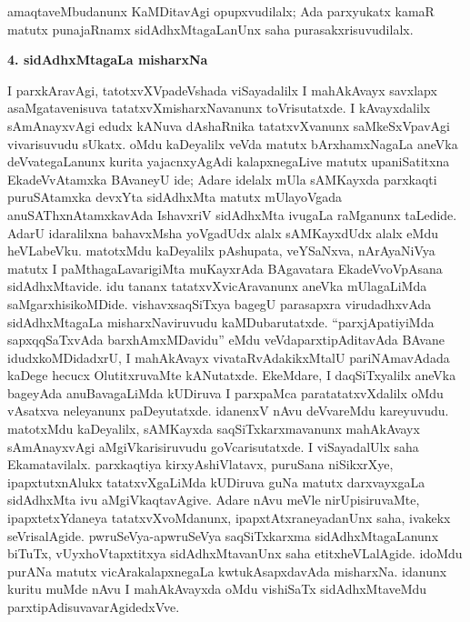 amaqtaveMbudanunx KaMDitavAgi opupxvudilalx; Ada parxyukatx kamaR matutx punajaRnamx sidAdhxMtagaLanUnx saha purasakxrisuvudilalx.

\newpage

\begin{center}
{\Large\bf 4. sidAdhxMtagaLa misharxNa}
\end{center}

I parxkAravAgi, tatotxvXVpadeVshada viSayadalilx I mahAkAvayx savxlapx asaMgata\-venisuva tatatxvXmisharxNavanunx toVrisutatxde. I kAvayxdalilx sAmAnayxvAgi edudx kANuva dAshaRnika tatatxvXvanunx saMkeSxVpavAgi vivarisuvudu sUkatx. oMdu kaDeyalilx veVda matutx bArxhamxNagaLa aneVka deVvategaLanunx kurita yajacnxyAgAdi kalapxnegaLive matutx upaniSatitxna EkadeVvAtamxka BAvaneyU ide; Adare idelalx mUla sAMKayxda parxkaqti puruSAtamxka devxYta sidAdhxMta matutx mUlayoVgada anuSAThxnAtamxkavAda IshavxriV sidAdhxMta ivugaLa raMganunx taLedide. AdarU idaralilxna bahavxMsha yoVgadUdx alalx sAMKayxdUdx alalx eMdu heVLabeVku. matotxMdu kaDeyalilx pAshupata, veYSaNxva, nArAyaNiVya matutx I paMthagaLavarigiMta muKayxrAda BAgavatara EkadeVvoVpAsana sidAdhxMtavide. idu tananx tatatxvXvicAravanunx aneVka mUlagaLiMda saMgarxhisikoMDide. vishavxsaqSiTxya bagegU parasapxra virudadhxvAda sidAdhxMtagaLa misharxNaviruvudu kaMDubarutatxde. ``parxjApatiyiMda sapxqqSaTxvAda barxhAmxMDavidu'' eMdu veVdaparxtipAditavAda BAvane idudxkoMDidadxrU, I mahAkAvayx vivataRvAdakikxMtalU pariNAmavAdada kaDege hecucx OlutitxruvaMte kANutatxde. EkeMdare, I daqSiTxyalilx aneVka bageyAda anuBavagaLiMda kUDiruva I parxpaMca paratatatxvXdalilx oMdu vAsatxva neleyanunx paDeyutatxde. idanenxV nAvu deVvareMdu kareyuvudu. matotxMdu kaDeyalilx, sAMKayxda saqSiTxkarxmavanunx mahAkAvayx sAmAnayxvAgi aMgiVkarisiruvudu goVcarisutatxde. I viSayadalUlx saha Ekamatavilalx. parxkaqtiya kirxyAshiVlatavx, puruSana niSikxrXye, ipapxtutxnAlukx tatatxvXgaLiMda kUDiruva guNa matutx darxvayxgaLa sidAdhxMta ivu aMgiVkaqtavAgive. Adare nAvu meVle nirUpisiruvaMte, ipapxtetxYdaneya tatatxvXvoMdanunx, ipapxtAtxraneyadanUnx saha, ivakekx seVrisalAgide. pwruSeVya-apwruSeVya saqSiTxkarxma sidAdhxMtagaLanunx biTuTx, vUyxhoVtapxtitxya sidAdhxMtavanUnx saha etitxheVLalAgide. idoMdu purANa matutx vicArakalapxnegaLa kwtukAsapxdavAda misharxNa. idanunx kuritu muMde nAvu I mahAkAvayxda oMdu vishiSaTx sidAdhxMtaveMdu parxtipAdisuvavarAgidedxVve.

